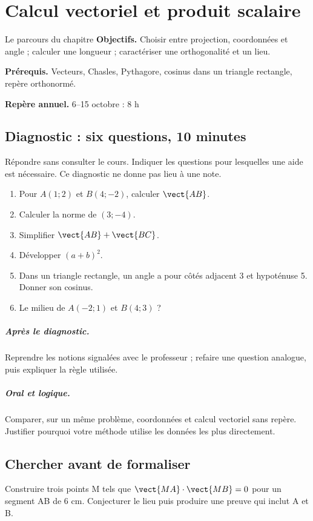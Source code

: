\chapter{Calcul vectoriel et produit scalaire}\label{C03}
\begin{repere}{Le parcours du chapitre}
\textbf{Objectifs.} Choisir entre projection, coordonnées et angle ; calculer une longueur ; caractériser une orthogonalité et un lieu.

\textbf{Prérequis.} Vecteurs, Chasles, Pythagore, cosinus dans un triangle rectangle, repère orthonormé.

\textbf{Repère annuel.} 6–15 octobre : 8 h\end{repere}
\section*{Diagnostic : six questions, 10 minutes}\label{C03-D}
Répondre sans consulter le cours. Indiquer les questions pour lesquelles une aide est nécessaire. Ce diagnostic ne donne pas lieu à une note.
\begin{enumerate}
\item Pour $A(1;2)$ et $B(4;-2)$, calculer $\vect{AB}$.
\item Calculer la norme de $(3;-4)$.
\item Simplifier $\vect{AB}+\vect{BC}$.
\item Développer $(a+b)^2$.
\item Dans un triangle rectangle, un angle a pour côtés adjacent 3 et hypoténuse 5. Donner son cosinus.
\item Le milieu de $A(-2;1)$ et $B(4;3)$ ?
\end{enumerate}
\paragraph{Après le diagnostic.} Reprendre les notions signalées avec le professeur ; refaire une question analogue, puis expliquer la règle utilisée.
\paragraph{Oral et logique.} Comparer, sur un même problème, coordonnées et calcul vectoriel sans repère. Justifier pourquoi votre méthode utilise les données les plus directement.
\clearpage
\section*{Chercher avant de formaliser}\label{C03-RECH}
Construire trois points M tels que $\vect{MA}\cdot\vect{MB}=0$ pour un segment AB de 6 cm. Conjecturer le lieu puis produire une preuve qui inclut A et B.
